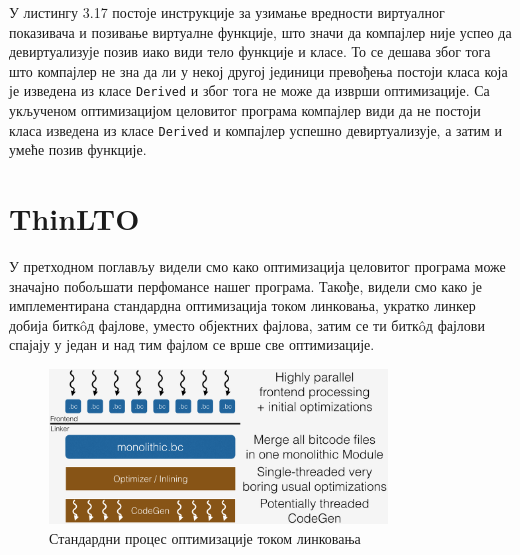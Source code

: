 \documentclass[12pt,oneside]{memoir}
\begin{document}
У листингу 3.17 постоје инструкције за узимање вредности
виртуалног показивача и позивање виртуалне функције, што значи да компајлер није успео
да девиртуализује позив иако види тело функције и класе.
То се дешава због тога што компајлер не зна да ли у некој другој јединици превођења
постоји класа која је изведена из класе \texttt{Derived} и због тога не може да изврши
оптимизације.
Са укљученом оптимизацијом целовитог програма компајлер види да не постоји класа
изведена из класе \texttt{Derived} и компајлер успешно девиртуализује, а затим и умеће
позив функције. 
 
 \chapter{ThinLTO}
 
 У претходном поглављу видели смо како оптимизација целовитог програма може значајно
 побољшати перфомансе нашег програма.
 Такође, видели смо како је имплементирана стандардна оптимизација током линковања,
 укратко линкер добија битк\^{o}д фајлове, уместо објектних фајлова, затим се ти
 битк\^{o}д фајлови спајају у један и над тим фајлом се врше све оптимизације.
 
\begin{figure}[!ht]
  \centering
  \includegraphics[width=0.8\textwidth]{LTO_normal.png}
  \caption{Стандардни процес оптимизације током линковања}
  \label{fig:grafikon}
\end{figure}
\end{document}
